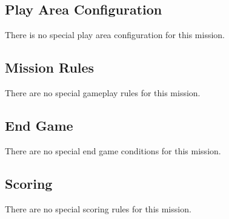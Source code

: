 \label{mission:annihilation}

\subsection{Play Area Configuration}

There is no special play area configuration for this mission.

\subsection{Mission Rules}

There are no special gameplay rules for this mission.

\subsection{End Game}

There are no special end game conditions for this mission.

\subsection{Scoring}

There are no special scoring rules for this mission.

